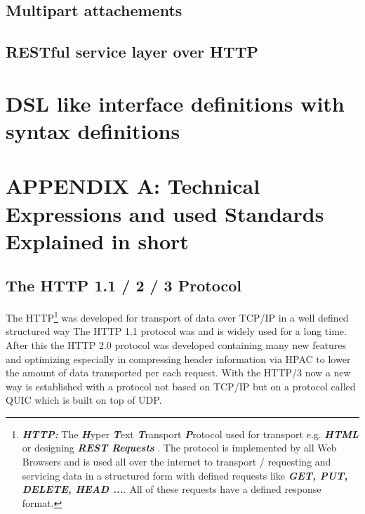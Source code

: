 \documentclass[10pt,a4paper,english]{article}
\newcommand{\abbrhighcol}[1]{\textbf{\textit{#1}}}
\begin{document}
\begin{multicols}{2}
\subsection{Multipart attachements}
\begin{flushleft}
\end{flushleft}
\subsection{RESTful service layer over HTTP }
\begin{flushleft}
\end{flushleft}
\section{DSL like interface definitions with syntax definitions}
\begin{flushleft}
\end{flushleft}
\section{APPENDIX A: Technical Expressions and used Standards Explained in short}
\subsection{The HTTP 1.1 / 2 / 3 Protocol}   
\begin{flushleft}
The HTTP\footnote{\abbrhighcol{HTTP:}  The \abbrhighcol{H}yper \abbrhighcol{T}ext \abbrhighcol {T}ransport \abbrhighcol {P}rotocol used for transport  e.g. \abbrhighcol{HTML} or designing  \abbrhighcol{REST Requests} . The protocol is implemented by all Web Browsers and is used all over the internet to transport / requesting and servicing data in a structured form with defined requests like \abbrhighcol{GET, PUT, DELETE, HEAD ...}. All of these requests have a defined response format.} was developed for transport of data over TCP/IP in a well defined structured way  
The HTTP 1.1 protocol was and is widely used for a long time.
After this the HTTP 2.0 protocol was developed containing many new features and optimizing especially in compressing header information via HPAC to lower the amount of data transported per each request.
With the HTTP/3 now a new way is established with a protocol not based on TCP/IP but on a protocol called QUIC which is built on top of UDP.
\end{flushleft}

\end{multicols}
\end{document}
